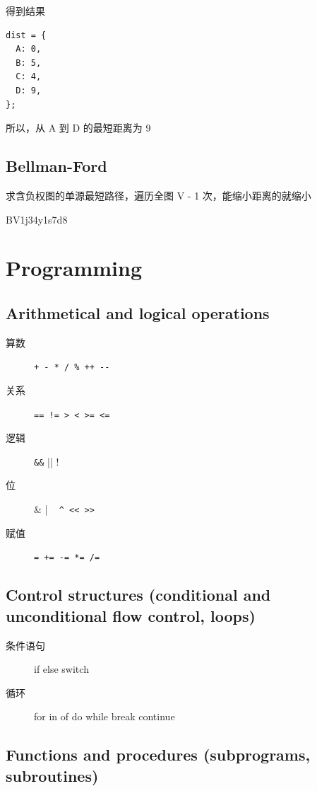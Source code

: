 \documentclass[11pt,journal,compsoc]{IEEEtran}
\begin{document}
得到结果

\begin{verbatim}
dist = {
  A: 0,
  B: 5,
  C: 4,
  D: 9,
};
\end{verbatim}

所以，从 A 到 D 的最短距离为 9


\subsection{Bellman-Ford}

求含负权图的单源最短路径，遍历全图 V - 1 次，能缩小距离的就缩小

BV1j34y1s7d8


\section{Programming}


\subsection{Arithmetical and logical operations}

\begin{description}
    \item[算数] \verb|+ - * / % ++ --|

    \item[关系] \verb|== != > < >= <=|

    \item[逻辑] \verb|&&| || !

    \item[位] \& | ~ \verb|^ << >>|

    \item[赋值] \verb|= += -= *= /=|
\end{description}


\subsection{Control structures (conditional and unconditional flow control, loops)}

\begin{description}
    \item[条件语句] if else switch

    \item[循环] for in of do while break continue
\end{description}


\subsection{Functions and procedures (subprograms, subroutines)}
\end{document}
